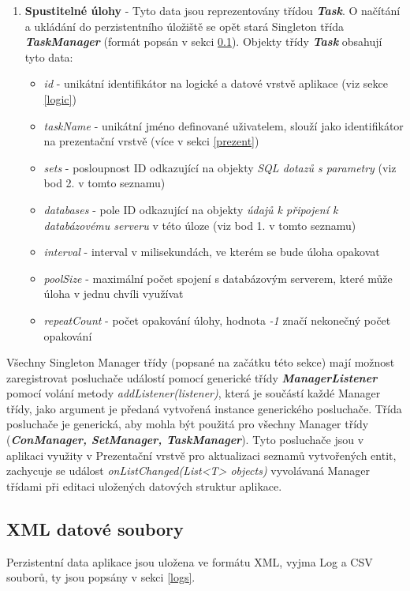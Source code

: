 \documentclass[czech,bachelor,public,dept460,male,cpdeclaration,twoside]{diploma}
\begin{document}
\begin{enumerate}
  \item \textbf{Spustitelné úlohy} - Tyto data jsou reprezentovány třídou \textbf{\emph{Task}}. O načítání a ukládání do perzistentního úložiště se opět stará Singleton třída \textbf{\emph{TaskManager}} (formát popsán v sekci \ref{xml}). Objekty třídy \textbf{\emph{Task}} obsahují tyto data:
    \begin{itemize}
  	\item \textit{id} - unikátní identifikátor na logické a datové vrstvě aplikace (viz sekce \ref{logic})
  	\item \textit{taskName} - unikátní jméno definované uživatelem, slouží jako identifikátor  na prezentační vrstvě (více v sekci \ref{prezent})
  	\item \textit{sets} - posloupnost ID odkazující na objekty \textit{SQL dotazů s parametry} (viz bod 2. v tomto seznamu)
  	\item \textit{databases} - pole ID odkazující na objekty \textit{údajů k připojení k databázovému serveru} v této úloze (viz bod 1. v tomto seznamu)
  	\item \textit{interval} - interval v milisekundách, ve kterém se bude úloha opakovat
  	\item \textit{poolSize} - maximální počet spojení s databázovým serverem, které může úloha v jednu chvíli využívat
  	\item \textit{repeatCount} - počet opakování úlohy, hodnota \textit{-1} značí nekonečný počet opakování
    \end{itemize}
\end{enumerate}

Všechny Singleton Manager třídy (popsané na začátku této sekce) mají možnost zaregistrovat posluchače událostí pomocí generické třídy \textbf{\emph{ManagerListener}}  pomocí volání metody \textit{addListener(listener)}, která je součástí každé Manager třídy, jako argument je předaná vytvořená instance generického posluchače. Třída posluchače je generická, aby mohla být použitá pro všechny Manager třídy (\textbf\emph{{ConManager, SetManager, TaskManager}}). Tyto posluchače jsou v aplikaci využity v Prezentační vrstvě pro aktualizaci seznamů vytvořených entit, zachycuje se událost \textit{onListChanged(List<T> objects)} vyvolávaná Manager třídami při editaci uložených datových struktur aplikace.

\newpage
\subsection{XML datové soubory} \label{xml}
Perzistentní data aplikace jsou uložena ve formátu XML, vyjma Log a CSV souborů, ty jsou popsány v sekci \ref{logs}.\newline
\end{document}
